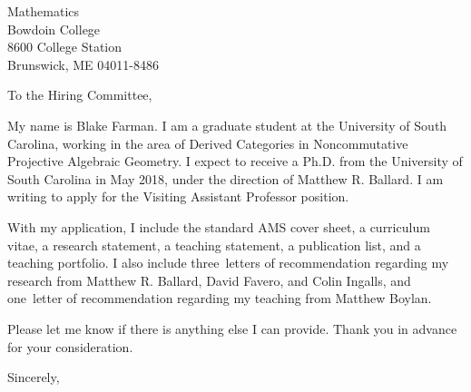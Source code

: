 \documentclass[12pt]{letter}
\date{\today}
\def\MSPRF{As requested in the posting, I have applied for an NSF Mathematical Sciences Postdoctoral Fellowship.
  If awarded, I plan to use it to carry out the proposed research laid out in my research statement at the University of Glasgow under the direction of Michael Wemyss.}
\def\position{Visiting Assistant Professor position}
\def\materials{the standard AMS cover sheet,
  a curriculum vitae,
  a research statement,
  a teaching statement,
  a publication list,
  and a teaching portfolio}
\def\contacts{Ettore Aldrovandi}
\def\numresrefs{three}
\def\numteachrefs{one}
\def\refs{Matthew R. Ballard, David Favero, and Colin Ingalls}
\def\teachingrefs{Matthew Boylan}
\begin{document}
\begin{letter}{
    Mathematics\\
    Bowdoin College\\
    8600 College Station\\
    Brunswick, ME 04011-8486
  }
  \opening{To the Hiring Committee,}
  
  My name is Blake Farman.
  I am a graduate student at the University of South Carolina, working in the area of Derived Categories in Noncommutative Projective Algebraic Geometry.
  I expect to receive a Ph.D. from the University of South Carolina in May 2018, under the direction of Matthew R. Ballard.
  I am writing to apply for the \position.



  With my application, I include \materials.
  I also include \numresrefs\  letters of recommendation regarding my research from \refs, and \numteachrefs\ letter of recommendation regarding my teaching from \teachingrefs.

  
  Please let me know if there is anything else I can provide.
  Thank you in advance for your consideration.
  \closing{Sincerely,}
\end{letter}
\end{document}
